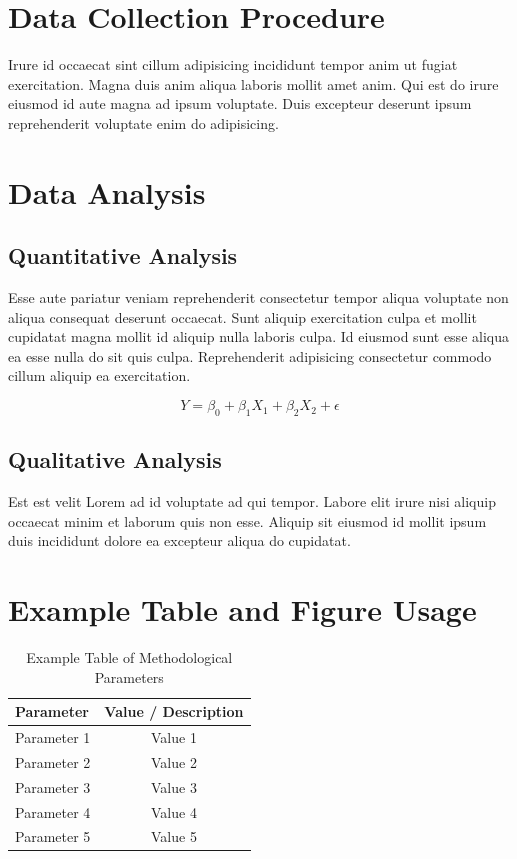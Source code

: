 \section{Data Collection Procedure}
Irure id occaecat sint cillum adipisicing incididunt tempor anim ut fugiat exercitation. Magna duis anim aliqua laboris mollit amet anim. Qui est do irure eiusmod id aute magna ad ipsum voluptate. Duis excepteur deserunt ipsum reprehenderit voluptate enim do adipisicing.

\section{Data Analysis}

\subsection{Quantitative Analysis}
Esse aute pariatur veniam reprehenderit consectetur tempor aliqua voluptate non aliqua consequat deserunt occaecat. Sunt aliquip exercitation culpa et mollit cupidatat magna mollit id aliquip nulla laboris culpa. Id eiusmod sunt esse aliqua ea esse nulla do sit quis culpa. Reprehenderit adipisicing consectetur commodo cillum aliquip ea exercitation.

\begin{equation}
  Y = \beta_0 + \beta_1 X_1 + \beta_2 X_2 + \epsilon
  \label{eq:example_regression}
\end{equation}

\subsection{Qualitative Analysis}
Est est velit Lorem ad id voluptate ad qui tempor. Labore elit irure nisi aliquip occaecat minim et laborum quis non esse. Aliquip sit eiusmod id mollit ipsum duis incididunt dolore ea excepteur aliqua do cupidatat.

\section{Example Table and Figure Usage}

\begin{table}[ht]
  \centering
  \caption{Example Table of Methodological Parameters}
  \label{tab:method_params}
  \begin{tabular}{lc}
    \hline\hline
    \textbf{Parameter} & \textbf{Value / Description} \\
    \hline
    Parameter 1 & Value 1 \\
    Parameter 2 & Value 2 \\
    Parameter 3 & Value 3 \\
    Parameter 4 & Value 4 \\
    Parameter 5 & Value 5 \\
    \hline\hline
  \end{tabular}
\end{table}

